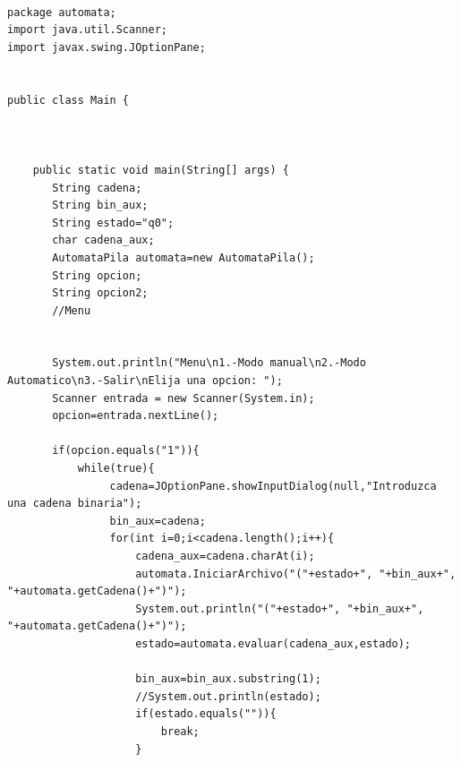 \lstset{language=Java, breaklines=true, basicstyle=\footnotesize}
\begin{lstlisting}[frame=single]
	
package automata;
import java.util.Scanner;
import javax.swing.JOptionPane;


public class Main {
    
    

    public static void main(String[] args) {
       String cadena;
       String bin_aux;
       String estado="q0";
       char cadena_aux;
       AutomataPila automata=new AutomataPila();
       String opcion;
       String opcion2;
       //Menu
       
       
       System.out.println("Menu\n1.-Modo manual\n2.-Modo Automatico\n3.-Salir\nElija una opcion: ");
       Scanner entrada = new Scanner(System.in);
       opcion=entrada.nextLine();
       
       if(opcion.equals("1")){
           while(true){
                cadena=JOptionPane.showInputDialog(null,"Introduzca una cadena binaria");
                bin_aux=cadena; 
                for(int i=0;i<cadena.length();i++){
                    cadena_aux=cadena.charAt(i);
                    automata.IniciarArchivo("("+estado+", "+bin_aux+", "+automata.getCadena()+")");
                    System.out.println("("+estado+", "+bin_aux+", "+automata.getCadena()+")");
                    estado=automata.evaluar(cadena_aux,estado);
                    
                    bin_aux=bin_aux.substring(1);
                    //System.out.println(estado);
                    if(estado.equals("")){
                        break;
                    }
 

\end{lstlisting}
